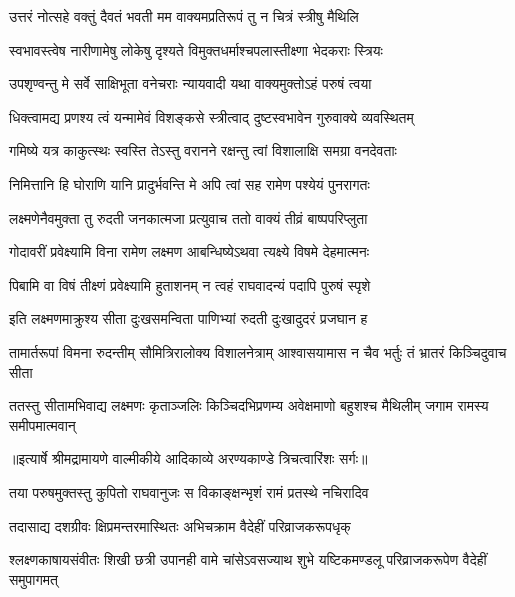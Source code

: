 \twolineshloka
{उत्तरं नोत्सहे वक्तुं दैवतं भवती मम}
{वाक्यमप्रतिरूपं तु न चित्रं स्त्रीषु मैथिलि} %

\twolineshloka
{स्वभावस्त्वेष नारीणामेषु लोकेषु दृश्यते}
{विमुक्तधर्माश्चपलास्तीक्ष्णा भेदकराः स्त्रियः} %

\twolineshloka
{उपशृण्वन्तु मे सर्वे साक्षिभूता वनेचराः}
{न्यायवादी यथा वाक्यमुक्तोऽहं परुषं त्वया} %

\twolineshloka
{धिक्त्वामद्य प्रणश्य त्वं यन्मामेवं विशङ्कसे}
{स्त्रीत्वाद् दुष्टस्वभावेन गुरुवाक्ये व्यवस्थितम्} %

\twolineshloka
{गमिष्ये यत्र काकुत्स्थः स्वस्ति तेऽस्तु वरानने}
{रक्षन्तु त्वां विशालाक्षि समग्रा वनदेवताः} %

\twolineshloka
{निमित्तानि हि घोराणि यानि प्रादुर्भवन्ति मे}
{अपि त्वां सह रामेण पश्येयं पुनरागतः} %

\twolineshloka
{लक्ष्मणेनैवमुक्ता तु रुदती जनकात्मजा}
{प्रत्युवाच ततो वाक्यं तीव्रं बाष्पपरिप्लुता} %

\twolineshloka
{गोदावरीं प्रवेक्ष्यामि विना रामेण लक्ष्मण}
{आबन्धिष्येऽथवा त्यक्ष्ये विषमे देहमात्मनः} %

\twolineshloka
{पिबामि वा विषं तीक्ष्णं प्रवेक्ष्यामि हुताशनम्}
{न त्वहं राघवादन्यं पदापि पुरुषं स्पृशे} %

\twolineshloka
{इति लक्ष्मणमाक्रुश्य सीता दुःखसमन्विता}
{पाणिभ्यां रुदती दुःखादुदरं प्रजघान ह} %

\fourlineindentedshloka
{तामार्तरूपां विमना रुदन्तीम्}
{सौमित्रिरालोक्य विशालनेत्राम्}
{आश्वासयामास न चैव भर्तुः}
{तं भ्रातरं किञ्चिदुवाच सीता} %

\fourlineindentedshloka
{ततस्तु सीतामभिवाद्य लक्ष्मणः}
{कृताञ्जलिः किञ्चिदभिप्रणम्य}
{अवेक्षमाणो बहुशश्च मैथिलीम्}
{जगाम रामस्य समीपमात्मवान्} %


{॥इत्यार्षे श्रीमद्रामायणे वाल्मीकीये आदिकाव्ये अरण्यकाण्डे त्रिचत्वारिंशः सर्गः॥}


\twolineshloka
{तया परुषमुक्तस्तु कुपितो राघवानुजः}
{स विकाङ्क्षन्भृशं रामं प्रतस्थे नचिरादिव} %

\twolineshloka
{तदासाद्य दशग्रीवः क्षिप्रमन्तरमास्थितः}
{अभिचक्राम वैदेहीं परिव्राजकरूपधृक्} %

\threelineshloka
{श्लक्ष्णकाषायसंवीतः शिखी छत्री उपानही}
{वामे चांसेऽवसज्याथ शुभे यष्टिकमण्डलू}
{परिव्राजकरूपेण वैदेहीं समुपागमत्} %

